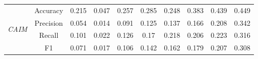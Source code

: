 \begin{table}[H]
\begin{tabular}{|c|c|c|c|c|c|c|c|c|c|}
        \multirow{4}{*}{\textit{CAIM}}  & Accuracy & 0.215 & 0.047 & 0.257 & 0.285 & 0.248 & 0.383 & 0.439 & 0.449 \\ \cline{2-10}
                                         & Precision & 0.054 & 0.014 & 0.091 & 0.125 & 0.137 & 0.166 & 0.208 & 0.342 \\ \cline{2-10}
                                         & Recall & 0.101 & 0.022 & 0.126 & 0.17 & 0.218 & 0.206 & 0.223 & 0.316 \\ \cline{2-10}
                                         & F1 & 0.071 & 0.017 & 0.106 & 0.142 & 0.162 & 0.179 & 0.207 & 0.308 \\ \hline \hline
            \hline
        \end{tabular}
    \end{table}